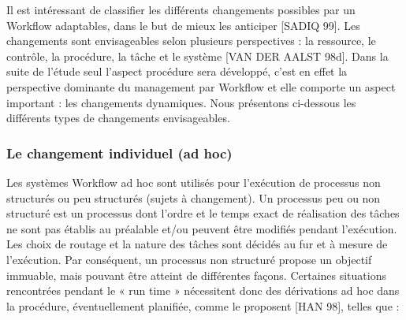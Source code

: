 Il est intéressant de classifier les différents changements possibles par un Workflow adaptables, dans le but de mieux les anticiper [SADIQ 99]. Les changements sont envisageables
selon plusieurs perspectives : la ressource, le contrôle, la procédure, la tâche et le système [VAN DER AALST 98d]. Dans la suite de l’étude seul l’aspect procédure sera développé,
c’est en effet la perspective dominante du management par Workflow et elle comporte un
aspect important : les changements dynamiques. Nous présentons ci-dessous les différents
types de changements envisageables. 

\subsubsection{Le changement individuel (ad hoc) }
Les systèmes Workflow ad hoc sont utilisés pour l’exécution de processus non structurés
ou peu structurés (sujets à changement). Un processus peu ou non structuré est un processus
dont l’ordre et le temps exact de réalisation des tâches ne sont pas établis au préalable et/ou peuvent être modifiés pendant l’exécution. Les choix de routage et la nature des tâches sont décidés au fur et à mesure de l’exécution. Par conséquent, un processus non structuré propose un objectif immuable, mais pouvant être atteint de différentes façons. Certaines situations rencontrées pendant le « run time » nécessitent donc des dérivations ad hoc dans la procédure, éventuellement planifiée, comme le proposent [HAN 98], telles que :
